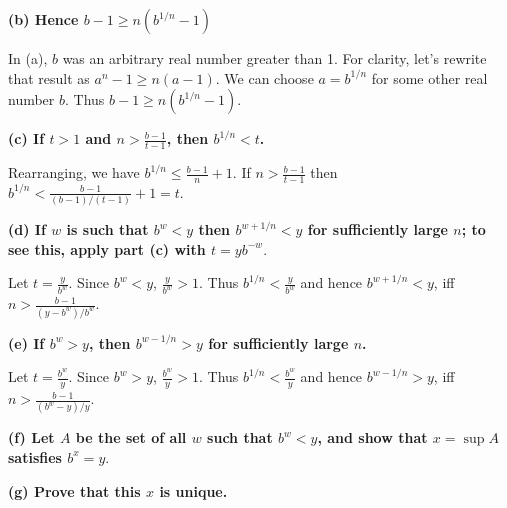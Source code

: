 \textbf{(b) Hence $b - 1 \geq n(b^{1/n} - 1)$}

In (a), $b$ was an arbitrary real number greater than 1. For clarity, let's
rewrite that result as $a^n - 1 \geq n(a-1)$. We can choose $a=b^{1/n}$ for
some other real number $b$. Thus $b - 1 \geq n(b^{1/n}-1)$.

\textbf{(c) If $t > 1$ and $n > \frac{b-1}{t-1}$, then $b^{1/n} < t$.}

Rearranging, we have $b^{1/n} \leq \frac{b-1}{n} + 1$. If $n > \frac{b-1}{t-1}$
then $b^{1/n} < \frac{b-1}{(b-1)/(t-1)} + 1 = t$.

\textbf{(d) If $w$ is such that $b^w < y$ then $b^{w + 1/n} < y$ for sufficiently
large $n$; to see this, apply part (c) with $t = yb^{-w}.$}

Let $t = \frac{y}{b^w}$. Since $b^w < y$, $\frac{y}{b^w} > 1$. Thus $b^{1/n} <
\frac{y}{b^w}$ and hence $b^{w + 1/n} < y$, iff $n > \frac{b-1}{(y -
b^w)/b^w}$.

\textbf{(e) If $b^w > y$, then $b^{w - 1/n} > y$ for sufficiently large $n$.}

Let $t = \frac{b^w}{y}$. Since $b^w > y$, $\frac{b^w}{y} > 1$. Thus $b^{1/n} <
\frac{b^w}{y}$ and hence $b^{w - 1/n} > y$, iff $n > \frac{b-1}{(b^w -
y)/y}$.


\textbf{(f) Let $A$ be the set of all $w$ such that $b^w < y$, and show that $x =
\sup A$ satisfies $b^x = y.$}

\textbf{(g) Prove that this $x$ is unique.}
